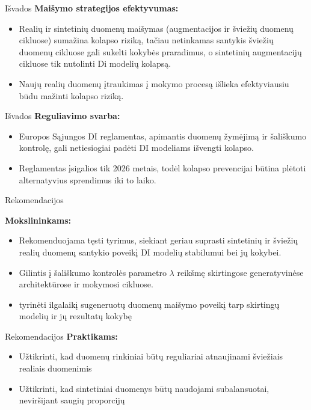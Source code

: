 \documentclass{beamer}
\begin{document}
\begin{frame}{Išvados}
    \textbf{Maišymo strategijos efektyvumas:}
            \begin{itemize}
                \item Realių ir sintetinių duomenų maišymas (augmentacijos ir šviežių duomenų cikluose) sumažina kolapso riziką, tačiau netinkamas santykis šviežių duomenų cikluose gali sukelti kokybės praradimus, o sintetinių augmentacijų cikluose tik nutolinti Di modelių kolapsą.
                \item Naujų realių duomenų įtraukimas į mokymo procesą išlieka efektyviausiu būdu mažinti kolapso riziką.
            \end{itemize}
\end{frame}



\begin{frame}{Išvados}
    \textbf{Reguliavimo svarba:}
        \begin{itemize}
            \item Europos Sąjungos DI reglamentas, apimantis duomenų žymėjimą ir šališkumo kontrolę, gali netiesiogiai padėti DI modeliams išvengti kolapso.
            \item Reglamentas įsigalios tik 2026 metais, todėl kolapso prevencijai būtina plėtoti alternatyvius sprendimus iki to laiko.
        \end{itemize}
\end{frame}

\begin{frame}{Rekomendacijos}
   
        \textbf{Mokslininkams:} 
        
        \begin{itemize}
            \item Rekomenduojama tęsti tyrimus, siekiant geriau suprasti sintetinių ir šviežių realių duomenų santykio poveikį DI modelių stabilumui bei jų kokybei.
            \item Gilintis į šališkumo kontrolės parametro \(\lambda\) reikšmę skirtingose generatyvinėse architektūrose ir mokymosi cikluose.
            \item tyrinėti ilgalaikį sugeneruotų duomenų maišymo poveikį tarp skirtingų modelių ir jų rezultatų kokybę
        \end{itemize}

   
\end{frame}


\begin{frame}{Rekomendacijos}
     \textbf{Praktikams:}
     \begin{itemize}
         \item Užtikrinti, kad duomenų rinkiniai būtų reguliariai atnaujinami šviežiais realiais duomenimis
         \item Užtikrinti, kad sintetiniai duomenys būtų naudojami subalansuotai, neviršijant saugių proporcijų
     \end{itemize}
\end{frame}
\end{document}
